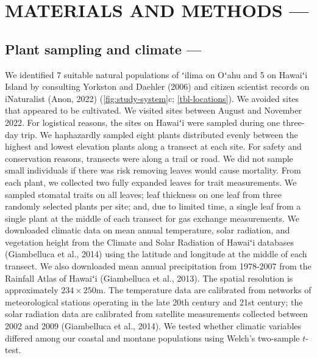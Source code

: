 \documentclass[
  letterpaper,
  DIV=11,
  numbers=noendperiod]{scrartcl}
\begin{document}
\hypertarget{methods}{%
\section{MATERIALS AND METHODS ---}\label{methods}}

\hypertarget{plant-sampling}{%
\subsection{Plant sampling and climate ---}\label{plant-sampling}}

We identified 7 suitable natural populations of ʻilima on Oʻahu and 5 on
Hawaiʻi Island by consulting Yorkston and Daehler (2006) and citizen
scientist records on iNaturalist (Anon, 2022)
(\autoref{fig:study-system}c; \autoref{tbl-locations}). We avoided sites
that appeared to be cultivated. We visited sites between August and
November 2022. For logistical reasons, the sites on Hawaiʻi were sampled
during one three-day trip. We haphazardly sampled eight plants
distributed evenly between the highest and lowest elevation plants along
a transect at each site. For safety and conservation reasons, transects
were along a trail or road. We did not sample small individuals if there
was risk removing leaves would cause mortality. From each plant, we
collected two fully expanded leaves for trait measurements. We sampled
stomatal traits on all leaves; leaf thickness on one leaf from three
randomly selected plants per site; and, due to limited time, a single
leaf from a single plant at the middle of each transect for gas exchange
measurements. We downloaded climatic data on mean annual temperature,
solar radiation, and vegetation height from the Climate and Solar
Radiation of Hawaiʻi databases (Giambelluca et al., 2014) using the
latitude and longitude at the middle of each transect. We also
downloaded mean annual precipitation from 1978-2007 from the Rainfall
Atlas of Hawaiʻi (Giambelluca et al., 2013). The spatial resolution is
approximately \(234 \times 250\)m. The temperature data are calibrated
from networks of meteorological stations operating in the late 20th
century and 21st century; the solar radiation data are calibrated from
satellite measurements collected between 2002 and 2009 (Giambelluca et
al., 2014). We tested whether climatic variables differed among our
coastal and montane populations using Welch's two-sample \(t\)-test.
\end{document}

